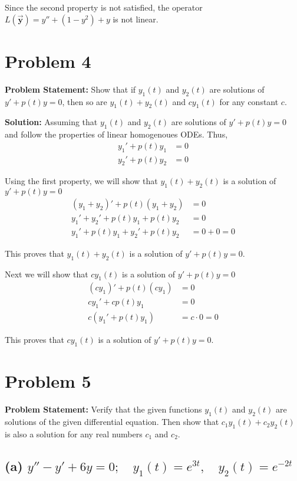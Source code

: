 \documentclass[12pt, letterpaper]{article}
\begin{document}
Since the second property is not satisfied, the operator $L(\vec{\textbf{y}}) = y'' + (1-y^2) + y$ is not linear.

\section*{Problem 4}
\textbf{Problem Statement:} Show that if $y_1(t)$ and $y_2(t)$ are solutions of $y' + p(t)y = 0$, then so are $y_1(t) + y_2(t)$ and $cy_1(t)$ for any constant $c$.

\textbf{Solution:} Assuming that $y_1(t)$ and $y_2(t)$ are solutions of $y' + p(t)y = 0$ and follow the properties of linear homogenoues ODEs. Thus,
\begin{align*}
    y_1' + p(t)y_1 &= 0 \\
    y_2' + p(t)y_2 &= 0
\end{align*}

Using the first property, we will show that $y_1(t) + y_2(t)$ is a solution of $y' + p(t)y = 0$
\begin{align*}
    (y_1 + y_2)' + p(t)(y_1 + y_2) &= 0 \\
    y_1' + y_2' + p(t)y_1 + p(t)y_2 &= 0 \\
    y_1' + p(t)y_1 + y_2' + p(t)y_2 &= 0 + 0 = 0 
\end{align*}

This proves that $y_1(t) + y_2(t)$ is a solution of $y' + p(t)y = 0$. 

Next we will show that $cy_1(t)$ is a solution of $y' + p(t)y = 0$
\begin{align*}
    (cy_1)' + p(t)(cy_1) &= 0 \\
    cy_1' + cp(t)y_1 &= 0 \\
    c(y_1' + p(t)y_1) &= c \cdot 0 = 0 
\end{align*}

This proves that $cy_1(t)$ is a solution of $y' + p(t)y = 0$.

\section*{Problem 5}
\textbf{Problem Statement:} Verify that the given functions $y_1(t)$ and $y_2(t)$ are solutions of the given differential equation. Then show that $c_1y_1(t) + c_2y_2(t)$ is also a solution for any real numbers $c_1$ and $c_2$.
\subsection*{(a) $y'' - y' + 6y = 0; \quad y_1(t) = e^{3t}, \quad y_2(t) = e^{-2t}$}
\end{document}

